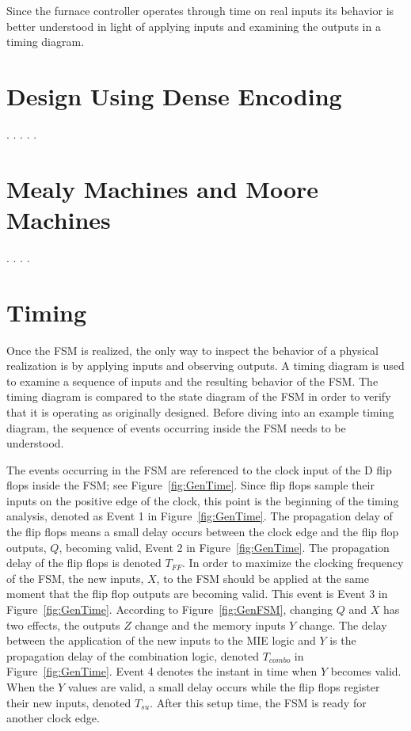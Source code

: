 Since the furnace controller operates through time on real
inputs its behavior is better understood in light of applying 
inputs and examining the outputs in a timing diagram.


\section{Design Using Dense Encoding}
\pagebreak
.
\pagebreak
.
\pagebreak
.
\pagebreak
.
\pagebreak
.

\section{Mealy Machines and Moore Machines}
\pagebreak
.
\pagebreak
.
\pagebreak
.
\pagebreak
.

\section{Timing}
Once the FSM is realized, the only way to inspect the behavior of a physical
realization is by applying inputs and observing outputs.  A timing 
diagram is used to examine a sequence of inputs and the resulting behavior of the FSM.
The timing diagram is compared to the state diagram of the FSM in order 
to verify that it is operating as originally designed.  Before diving into an 
example timing diagram,  the sequence of events
occurring  inside the FSM needs to be understood.

The events occurring in the FSM are referenced to the clock input of the 
D flip flops inside the FSM; see Figure~\ref{fig:GenTime}.  Since flip
flops sample their inputs on the positive edge of the clock, this point is the
beginning of the timing analysis, denoted as Event 1 in 
Figure~\ref{fig:GenTime}.  The propagation delay of the flip flops means 
a small delay occurs between the clock edge and the flip flop outputs, $Q$,
becoming valid, Event 2 in Figure~\ref{fig:GenTime}.  The propagation delay 
of the flip flops is denoted $T_{FF}$.  In order to maximize the clocking 
frequency of the FSM, the new inputs, $X$, to the FSM should be applied at the
same moment that the flip flop outputs are becoming valid.  This event is Event 3
in Figure~\ref{fig:GenTime}. According to Figure~\ref{fig:GenFSM}, changing
$Q$ and $X$ has two effects, the outputs $Z$ change and the memory
inputs $Y$ change.  The delay between the application of the new inputs to
the MIE logic and $Y$ is the propagation delay of the combination logic, denoted
$T_{combo}$ in Figure~\ref{fig:GenTime}.  Event 4 denotes the instant in time
when $Y$ becomes valid.  When the $Y$ values are valid, a small
delay occurs while the flip flops register their new inputs, denoted $T_{su}$.  After 
this setup time, the FSM is ready for another clock edge.  

